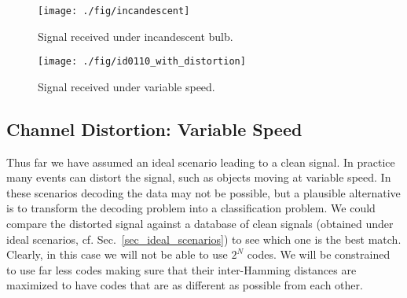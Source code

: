 \documentclass[10pt]{sig-alternate-05-2015}
\begin{document}
\begin{figure}[!t]
	\begin{minipage}[t]{0.485\linewidth}
		\texttt{[image: ./fig/incandescent]}
		\vspace{-6mm}
		\caption{Signal received \newline under incandescent bulb.}
		\label{fig_incandescent}
	\end{minipage}\hfill \begin{minipage}[t]{.485\linewidth}
		\texttt{[image: ./fig/id0110\_with\_distortion]}
		\vspace{-6mm}
		\caption{Signal received \newline under variable speed.}
		\label{fig_id_with_distortion}
	\end{minipage} 
	\vspace{-4mm}
\end{figure}

\subsection{Channel Distortion: Variable Speed}
Thus far we have assumed an ideal scenario leading to a clean signal. In practice many events can distort the signal, such as objects moving at variable speed.
In these scenarios decoding the data may not be possible, but a plausible alternative is to transform the decoding problem into a classification problem.
We could compare the distorted signal against a database of clean signals (obtained under ideal scenarios, cf. Sec.~\ref{sec_ideal_scenarios}) to see which one is the best match. Clearly, in this case we will not be able to use $2^N$ codes. We will be constrained to use far less codes making sure that their inter-Hamming distances are maximized to have codes that are as different as possible from each other. 
\end{document}
